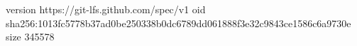 version https://git-lfs.github.com/spec/v1
oid sha256:1013fc5778b37ad0be250338b0dc6789dd061888f3e32c9843ce1586c6a9730e
size 345578

